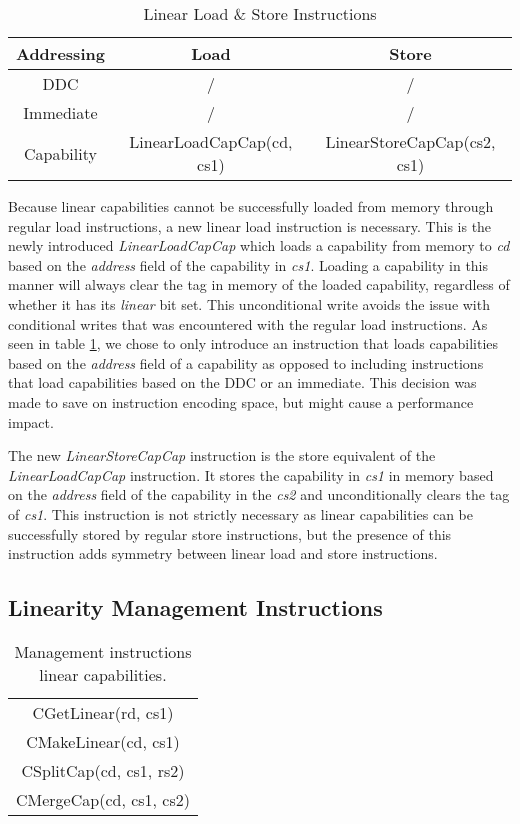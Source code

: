 \begin{table}[h]
\centering
\begin{tabular}{| c | c | c |}
\hline
 Addressing & Load & Store \\
 \hline
 DDC & / & / \\
 Immediate & / & / \\
 Capability & LinearLoadCapCap(cd, cs1) & LinearStoreCapCap(cs2, cs1) \\
\hline
\end{tabular}
\caption{Linear Load \& Store Instructions}
\label{table:linloadstoreinst}
\end{table}

Because linear capabilities cannot be successfully loaded from memory through regular load instructions, a new linear load instruction is necessary. This is the newly introduced \textit{LinearLoadCapCap} which loads a capability from memory to \textit{cd} based on the \textit{address} field of the capability in \textit{cs1}. Loading a capability in this manner will always clear the tag in memory of the loaded capability, regardless of whether it has its \textit{linear} bit set. This unconditional write avoids the issue with conditional writes that was encountered with the regular load instructions. As seen in table \ref{table:linloadstoreinst}, we chose to only introduce an instruction that loads capabilities based on the \textit{address} field of a capability as opposed to including instructions that load capabilities based on the DDC or an immediate. This decision was made to save on instruction encoding space, but might cause a performance impact.

The new \textit{LinearStoreCapCap} instruction is the store equivalent of the \textit{LinearLoadCapCap} instruction. It stores the capability in \textit{cs1} in memory based on the \textit{address} field of the capability in the \textit{cs2} and unconditionally clears the tag of \textit{cs1}. This instruction is not strictly necessary as linear capabilities can be successfully stored by regular store instructions, but the presence of this instruction adds symmetry between linear load and store instructions.

\subsection{Linearity Management Instructions}
\label{sec:lininsts}
\begin{table}[h]
\centering
\begin{tabular}{| c |}
\hline
 CGetLinear(rd, cs1) \\
 CMakeLinear(cd, cs1) \\
 CSplitCap(cd, cs1, rs2) \\
 CMergeCap(cd, cs1, cs2) \\
\hline
\end{tabular}
\caption{Management instructions linear capabilities.}
\label{table:lininstmanag}
\end{table}

